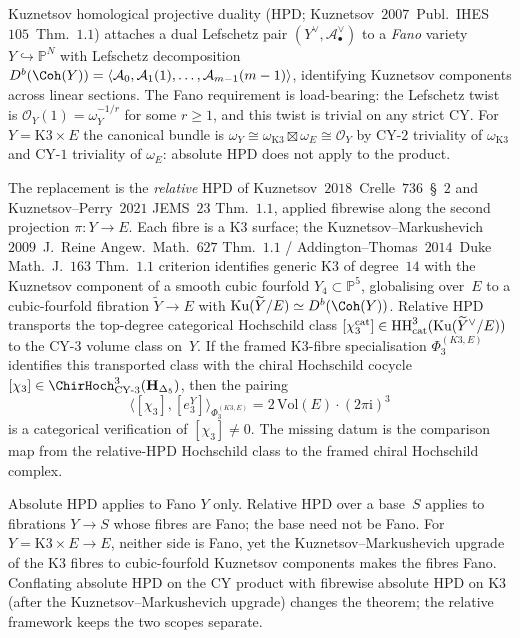 \begin{remark}
\label{rem:cy-cat-hpd-k3e-relative}
Kuznetsov homological projective duality (HPD; Kuznetsov~$2007$~Publ.\ IHES~$105$~Thm.~$1.1$) attaches a dual Lefschetz pair $(Y^\vee,\mathcal A^\vee_\bullet)$ to a \emph{Fano} variety $Y\hookrightarrow\mathbb P^N$ with Lefschetz decomposition $D^b(\Coh(Y))=\langle\mathcal A_0,\mathcal A_1(1),\ldots,\mathcal A_{m-1}(m-1)\rangle$, identifying Kuznetsov components across linear sections. The Fano requirement is load-bearing: the Lefschetz twist is $\mathcal O_Y(1)=\omega_Y^{-1/r}$ for some $r\ge 1$, and this twist is trivial on any strict CY. For $Y=\mathrm{K3}\times E$ the canonical bundle is $\omega_Y\cong\omega_{\mathrm{K3}}\boxtimes\omega_E\cong\mathcal O_Y$ by CY-$2$ triviality of $\omega_{\mathrm{K3}}$ and CY-$1$ triviality of $\omega_E$: absolute HPD does not apply to the product.

The replacement is the \emph{relative} HPD of Kuznetsov~$2018$~Crelle~$736$~\S~$2$ and Kuznetsov--Perry~$2021$ JEMS~$23$ Thm.~$1.1$, applied fibrewise along the second projection $\pi:Y\to E$. Each fibre is a K3 surface; the Kuznetsov--Markushevich~$2009$~J.\ Reine Angew.\ Math.\ $627$ Thm.~$1.1$ / Addington--Thomas~$2014$~Duke Math.\ J.\ $163$ Thm.~$1.1$ criterion identifies generic K3 of degree~$14$ with the Kuznetsov component of a smooth cubic fourfold $Y_4\subset\mathbb P^5$, globalising over~$E$ to a cubic-fourfold fibration $\widetilde Y\to E$ with $\Kuz(\widetilde Y/E)\simeq D^b(\Coh(Y))$. Relative HPD transports the top-degree categorical Hochschild class $[\chi_3^{\mathrm{cat}}]\in\mathrm{HH}^3_{\mathrm{cat}}(\mathrm{Ku}(\widetilde Y^\vee/E))$ to the CY-$3$ volume class on~$Y$. If the framed K3-fibre specialisation $\Phi_3^{(K3,E)}$ identifies this transported class with the chiral Hochschild cocycle $[\chi_3]\in\ChirHoch^3_{\mathrm{CY\text{-}3}}(\mathbf H_{\Delta_5})$, then the pairing
\[
\langle[\chi_3],[e_3^Y]\rangle_{\Phi_3^{(K3,E)}}
=2\,\mathrm{Vol}(E)\cdot(2\pi\mathrm i)^3
\]
is a categorical verification of $[\chi_3]\neq 0$. The missing datum is the comparison map from the relative-HPD Hochschild class to the framed chiral Hochschild complex.

Absolute HPD applies to Fano $Y$ only. Relative HPD over a base~$S$ applies to fibrations $Y\to S$ whose fibres are Fano; the base need not be Fano. For $Y=\mathrm{K3}\times E\to E$, neither side is Fano, yet the Kuznetsov--Markushevich upgrade of the K3 fibres to cubic-fourfold Kuznetsov components makes the fibres Fano. Conflating absolute HPD on the CY product with fibrewise absolute HPD on K3 (after the Kuznetsov--Markushevich upgrade) changes the theorem; the relative framework keeps the two scopes separate.
\end{remark}

